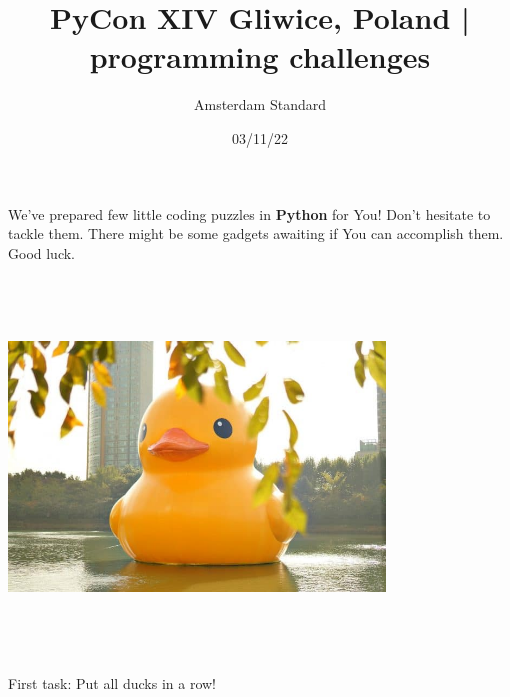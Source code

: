 \documentclass[12pt]{article}
\title{PyCon XIV Gliwice, Poland | programming challenges}
\author{Amsterdam Standard}
\date{03/11/22}
\begin{document}
\maketitle

We've prepared few little coding puzzles in \textbf{Python} for You! Don't hesitate to tackle them. There might be some gadgets awaiting if You can accomplish them. Good luck.

\vspace{1cm}

\centering
\includegraphics[width=10cm,height=10cm,keepaspectratio]{img/duck.jpg}

First task: Put all ducks in a row!
\end{document}
